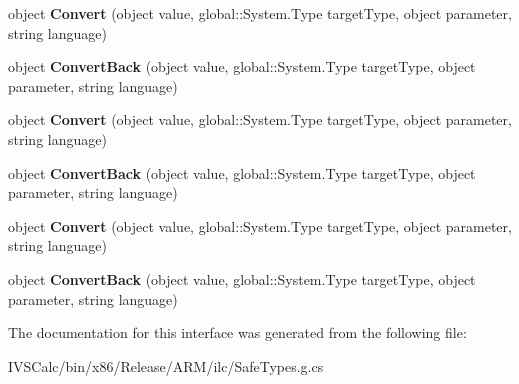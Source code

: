 \begin{DoxyCompactItemize}
object {\bfseries Convert} (object value, global\+::\+System.\+Type target\+Type, object parameter, string language)
\item 
\mbox{\label{interface_windows_1_1_u_i_1_1_xaml_1_1_data_1_1_i_value_converter_a34ff4ba1eae0486d624de1022902df8a}} 
object {\bfseries Convert\+Back} (object value, global\+::\+System.\+Type target\+Type, object parameter, string language)
\item 
\mbox{\label{interface_windows_1_1_u_i_1_1_xaml_1_1_data_1_1_i_value_converter_a42901db87e09f3c27528559240db2484}} 
object {\bfseries Convert} (object value, global\+::\+System.\+Type target\+Type, object parameter, string language)
\item 
\mbox{\label{interface_windows_1_1_u_i_1_1_xaml_1_1_data_1_1_i_value_converter_a34ff4ba1eae0486d624de1022902df8a}} 
object {\bfseries Convert\+Back} (object value, global\+::\+System.\+Type target\+Type, object parameter, string language)
\item 
\mbox{\label{interface_windows_1_1_u_i_1_1_xaml_1_1_data_1_1_i_value_converter_a42901db87e09f3c27528559240db2484}} 
object {\bfseries Convert} (object value, global\+::\+System.\+Type target\+Type, object parameter, string language)
\item 
\mbox{\label{interface_windows_1_1_u_i_1_1_xaml_1_1_data_1_1_i_value_converter_a34ff4ba1eae0486d624de1022902df8a}} 
object {\bfseries Convert\+Back} (object value, global\+::\+System.\+Type target\+Type, object parameter, string language)
\end{DoxyCompactItemize}


The documentation for this interface was generated from the following file\+:\begin{DoxyCompactItemize}
\item 
I\+V\+S\+Calc/bin/x86/\+Release/\+A\+R\+M/ilc/Safe\+Types.\+g.\+cs\end{DoxyCompactItemize}
